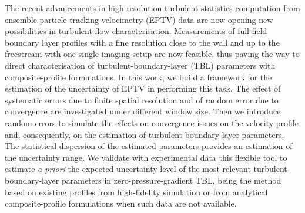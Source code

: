 %
\graphicspath{{paper1/}}%
%
%
%
\begin{paper}

\makepapertitle

%
\begin{paperabstract}
    The recent advancements in high-resolution turbulent-statistics computation from ensemble particle tracking velocimetry (EPTV) data are now opening new possibilities in turbulent-flow characterisation. Measurements of full-field boundary layer profiles with a fine resolution close to the wall and up to the freestream with one single imaging setup are now feasible, thus paving {the way} to direct characterisation of turbulent-boundary-layer (TBL) parameters with composite-profile formulations. In this work, we build a framework for the estimation of the uncertainty of EPTV in performing this task. The effect of systematic errors due to finite spatial resolution and of random error due to convergence are investigated under different window size. {Then we introduce random errors to simulate the effects on convergence issues on the velocity profile and, consequently, on the estimation of turbulent-boundary-layer parameters. The statistical dispersion of the estimated parameters provides an estimation of the uncertainty range.} We validate with experimental data {this} flexible tool to estimate \textit{a priori} the expected uncertainty level of the most relevant {turbulent-boundary-layer} parameters in zero-pressure-gradient TBL, being the method based on existing profiles from high-fidelity simulation or from analytical {composite-profile} formulations when such data are not available.
\end{paperabstract}


%




\end{paper}
